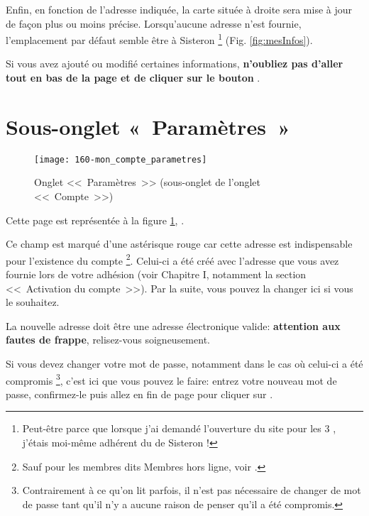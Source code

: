 \medskip

Enfin, en fonction de l'adresse indiquée, la carte située à droite sera mise à jour de façon plus ou moins précise. Lorsqu'aucune adresse n'est fournie, l'emplacement par défaut semble être à Sisteron%
\footnote{Peut-être parce que lorsque j'ai demandé l'ouverture du site \CF{} pour les 3 \sel{}, j'étais moi-même adhérent du \sel{} de Sisteron !} 
(Fig. \ref{fig:mesInfos}).

Si vous avez ajouté ou modifié certaines informations, \textbf{n'oubliez pas d'aller tout en bas de la page et de cliquer sur le bouton} .

\section{Sous-onglet «~Paramètres~»}
\begin{figure}
    \texttt{[image: 160-mon\_compte\_parametres]}
    \caption[Onglet <<~Paramètres~>>]{Onglet <<~Paramètres~>> (sous-onglet de l'onglet <<~Compte~>>)}
    \label{fig:pageParametres}
\end{figure}

Cette page est représentée à la figure \ref{fig:pageParametres}, .


Ce champ est marqué d'une astérisque rouge car cette adresse est indispensable pour l'existence du compte%
\footnote{Sauf pour les membres dits \og Membres hors ligne\fg, voir .}.
Celui-ci a été créé avec l'adresse que vous avez fournie lors de votre adhésion (voir Chapitre I, notamment la section <<~Activation du compte~>>). Par la suite, vous pouvez la changer ici si vous le souhaitez.

La nouvelle adresse doit être une adresse électronique valide: \textbf{attention aux fautes de frappe}, relisez-vous soigneusement.

\label{sec:changerMotDePasse}

Si vous devez changer votre mot de passe, notamment dans le cas où celui-ci a été compromis%
\footnote{Contrairement à ce qu'on lit parfois, il n'est pas nécessaire de changer de mot de passe tant qu'il n'y a aucune raison de penser qu'il a été compromis.},
 c’est ici que vous pouvez le faire: entrez votre nouveau mot de passe, confirmez-le puis allez en fin de page pour cliquer sur .

